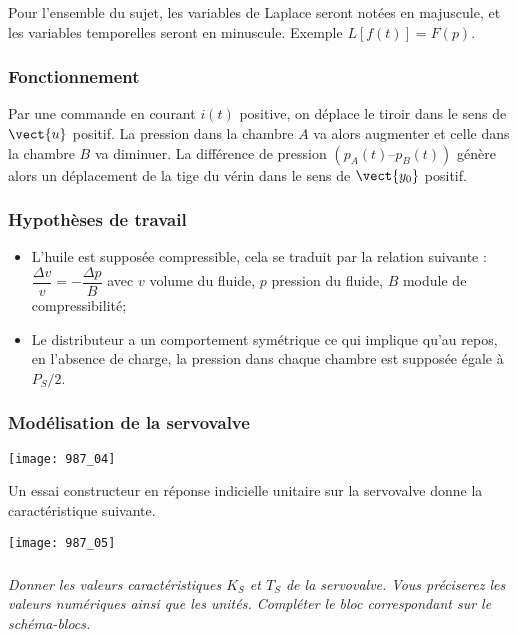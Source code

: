 Pour l’ensemble du sujet, les variables de Laplace seront notées en majuscule, et les
variables temporelles seront en minuscule. Exemple $L[f(t)] = F(p)$.


\subsubsection*{Fonctionnement}
Par une commande en courant $i(t)$ positive, on déplace le tiroir dans le sens de $\vect{u}$ positif. La
pression dans la chambre $A$ va alors augmenter et celle dans la chambre $B$ va diminuer.
La différence de pression $(p_A(t)– p_B(t))$ génère alors un déplacement de la tige du vérin dans
le sens de $\vect{y_0}$ positif.

\subsubsection*{Hypothèses de travail}
\begin{itemize}
\item L’huile est supposée compressible, cela se traduit par la relation suivante : $\dfrac{\Delta v}{v} = -\dfrac{\Delta p}{B}$ avec $v$ volume du fluide, $p$ pression du fluide, $B$ module de compressibilité; 
\item Le distributeur a un comportement symétrique ce qui implique qu’au repos, en
l’absence de charge, la pression dans chaque chambre est supposée égale à $P_S/2$.
\end{itemize}

\subsubsection*{Modélisation de la servovalve}
\begin{center}
\texttt{[image: 987\_04]}%
\end{center}

Un essai constructeur en réponse indicielle unitaire sur la servovalve donne la
caractéristique suivante.

\begin{center}
\texttt{[image: 987\_05]}%
\end{center}


\subparagraph{}
\textit{Donner les valeurs caractéristiques $K_S$ et $T_S$ de la
servovalve. Vous préciserez les valeurs numériques ainsi que les unités.
Compléter le bloc correspondant sur le schéma-blocs.}
\ifprof
\begin{corrige}
\end{corrige}
\else
\fi


